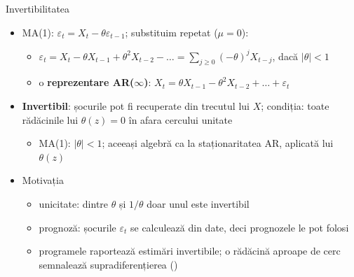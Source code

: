\begin{frame}{Invertibilitatea}
\itemsize{\small}
\begin{itemize}
    \item MA(1): $\varepsilon_t = X_t - \theta\varepsilon_{t-1}$; substituim repetat ($\mu = 0$):
    \begin{itemize}
        \item $\varepsilon_t = X_t - \theta X_{t-1} + \theta^2X_{t-2} - \dots = \sum_{j \ge 0}(-\theta)^jX_{t-j}$, dacă $|\theta| < 1$
        \item o \textbf{reprezentare AR($\infty$)}: $X_t = \theta X_{t-1} - \theta^2X_{t-2} + \dots + \varepsilon_t$
    \end{itemize}
    \item \textbf{Invertibil}: șocurile pot fi recuperate din trecutul lui $X$; condiția: toate rădăcinile lui $\theta(z) = 0$ în afara cercului unitate
    \begin{itemize}
        \item MA(1): $|\theta| < 1$; aceeași algebră ca la staționaritatea AR, aplicată lui $\theta(z)$
    \end{itemize}
    \item Motivația
    \begin{itemize}
        \item unicitate: dintre $\theta$ și $1/\theta$ doar unul este invertibil
        \item prognoză: șocurile $\varepsilon_t$ se calculează din date, deci prognozele le pot folosi
        \item programele raportează estimări invertibile; o rădăcină aproape de cerc semnalează supradiferențierea ()
    \end{itemize}
\end{itemize}
\end{frame}

